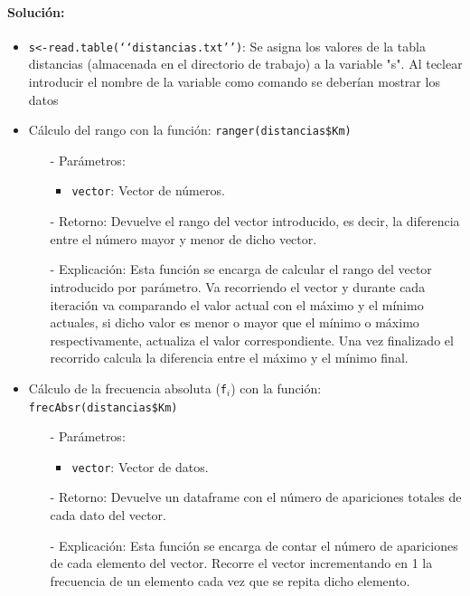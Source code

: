 \documentclass[a4paper, 12pt]{article}
\begin{document}
	\paragraph{Solución:}
	\begin{itemize}
		\item \texttt{s<-read.table(‘‘distancias.txt’’)}: Se asigna los valores de la tabla distancias (almacenada en el directorio de trabajo) a la variable "s". Al teclear introducir el nombre de la variable como comando se deberían mostrar los datos
		
		\item Cálculo del rango con la función: \texttt{ranger(distancias\$Km)}
		\begin{itemize}
			\item[-] Parámetros:
			\begin{itemize}
				\item \texttt{vector}: Vector de números.
			\end{itemize}
			
			\item[-]  Retorno: Devuelve el rango del vector introducido, es decir, la diferencia entre el número mayor y menor de dicho vector.
			
			\item[-] Explicación: Esta función se encarga de calcular el rango del vector introducido por parámetro. Va recorriendo el vector y durante cada iteración va comparando el valor actual con el máximo y el mínimo actuales, si dicho valor es menor o mayor que el mínimo o máximo respectivamente, actualiza el valor correspondiente. Una vez finalizado el recorrido calcula la diferencia entre el máximo y el mínimo final.
			\
		\end{itemize} 
		
		\item Cálculo de la frecuencia absoluta (\texttt{f$_{i}$}) con la función: \texttt{frecAbsr(distancias\$Km)}
		\begin{itemize}
			\item[-] Parámetros: 
			\begin{itemize}
				\item \texttt{vector}: Vector de datos.
			\end{itemize}
			
			\item[-] Retorno: Devuelve un dataframe con el número de apariciones totales de cada dato del vector. 
			
			\item[-] Explicación: Esta función se encarga de contar el número de apariciones de cada elemento del vector. Recorre el vector incrementando en 1 la frecuencia de un elemento cada vez que se repita dicho elemento.
		\end{itemize}
		

\end{itemize}
\end{document}
